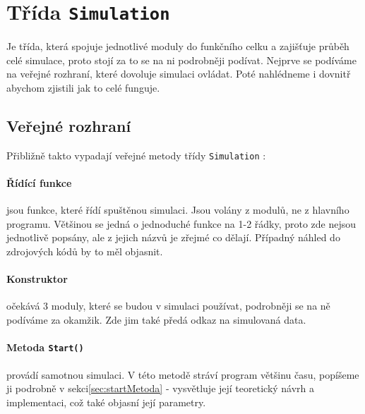 
\section{Třída \texttt{Simulation}}
Je třída, která spojuje jednotlivé moduly do funkčního celku a zajišťuje průběh celé simulace, proto stojí za to se na ni podrobněji podívat. Nejprve se podíváme na veřejné rozhraní, které dovoluje simulaci ovládat. Poté nahlédneme i dovnitř abychom zjistili jak to celé funguje.
\subsection{Veřejné rozhraní}
Přibližně takto vypadají veřejné metody třídy \texttt{Simulation} :
\paragraph{Řídící funkce}
jsou funkce, které řídí spuštěnou simulaci. Jsou volány z modulů, ne z hlavního programu. Většinou se jedná o jednoduché funkce na 1-2 řádky, proto zde nejsou jednotlivě popsány, ale z jejich názvů je zřejmé co dělají. Případný náhled do zdrojových kódů by to měl objasnit.
\paragraph{Konstruktor}
očekává 3 moduly, které se budou v simulaci používat, podrobněji se na ně podíváme za okamžik. Zde jim také předá odkaz na simulovaná data.
\paragraph{Metoda \texttt{Start()}}
provádí samotnou simulaci. V této metodě stráví program většinu času, popíšeme ji podrobně v sekci\ref{sec:startMetoda} - vysvětluje její teoretický návrh a implementaci, což také objasní její parametry.
